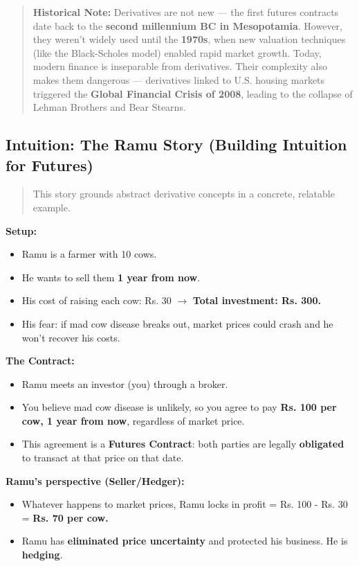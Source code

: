 \documentclass[12pt,openany]{book}
\begin{document}
\begin{quote}
    \textbf{Historical Note:} Derivatives are not new --- the first futures contracts date back to the \textbf{second millennium BC in Mesopotamia}. However, they weren't widely used until the \textbf{1970s}, when new valuation techniques (like the Black-Scholes model) enabled rapid market growth. Today, modern finance is inseparable from derivatives. Their complexity also makes them dangerous --- derivatives linked to U.S. housing markets triggered the \textbf{Global Financial Crisis of 2008}, leading to the collapse of Lehman Brothers and Bear Stearns.
\end{quote}

\subsection{Intuition: The Ramu Story (Building Intuition for Futures)}

\begin{quote}
    This story grounds abstract derivative concepts in a concrete, relatable example.
\end{quote}

\textbf{Setup:}
\begin{itemize}[leftmargin=*]
    \item Ramu is a farmer with 10 cows.
    \item He wants to sell them \textbf{1 year from now}.
    \item His cost of raising each cow: Rs. 30 $\rightarrow$ \textbf{Total investment: Rs. 300.}
    \item His fear: if mad cow disease breaks out, market prices could crash and he won't recover his costs.
\end{itemize}

\textbf{The Contract:}
\begin{itemize}[leftmargin=*]
    \item Ramu meets an investor (you) through a broker.
    \item You believe mad cow disease is unlikely, so you agree to pay \textbf{Rs. 100 per cow, 1 year from now}, regardless of market price.
    \item This agreement is a \textbf{Futures Contract}: both parties are legally \textbf{obligated} to transact at that price on that date.
\end{itemize}

\textbf{Ramu's perspective (Seller/Hedger):}
\begin{itemize}[leftmargin=*]
    \item Whatever happens to market prices, Ramu locks in profit = Rs. 100 - Rs. 30 = \textbf{Rs. 70 per cow.}
    \item Ramu has \textbf{eliminated price uncertainty} and protected his business. He is \textbf{hedging}.
\end{itemize}
\end{document}
